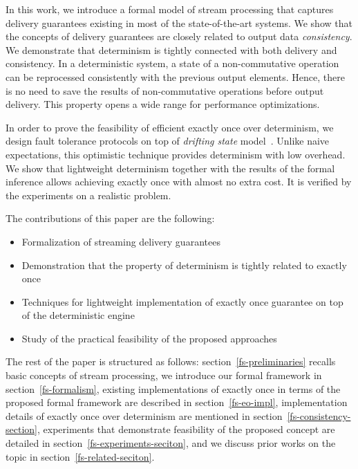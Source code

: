 In this work, we introduce a formal model of stream processing that captures delivery guarantees existing in most of the state-of-the-art systems. We show that the concepts of delivery guarantees are closely related to output data {\em consistency}. We demonstrate that determinism is tightly connected with both delivery and consistency. In a deterministic system, a state of a non-commutative operation can be reprocessed consistently with the previous output elements. Hence, there is no need to save the results of non-commutative operations before output delivery. This property opens a wide range for performance optimizations.

In order to prove the feasibility of efficient exactly once over determinism, we design fault tolerance protocols on top of {\em drifting state} model~\cite{we2018adbis}. Unlike naive expectations, this optimistic technique provides determinism with low overhead. We show that lightweight determinism together with the results of the formal inference allows achieving exactly once with almost no extra cost. It is verified by the experiments on a realistic problem.

The contributions of this paper are the following: 
\begin{itemize}
    \item Formalization of streaming delivery guarantees 
    \item Demonstration that the property of determinism is tightly related to exactly once
    \item Techniques for lightweight implementation of exactly once guarantee on top of the deterministic engine
    \item Study of the practical feasibility of the proposed approaches
\end{itemize}

The rest of the paper is structured as follows: section~\ref{fs-preliminaries} recalls basic concepts of stream processing, we introduce our formal framework in section~\ref{fs-formalism}, existing implementations of exactly once in terms of the proposed formal framework are described in section~\ref{fs-eo-impl}, implementation details of exactly once over determinism are mentioned in section~\ref{fs-consistency-section}, experiments that demonstrate feasibility of the proposed concept are detailed in section~\ref{fs-experiments-seciton}, and we discuss prior works on the topic in section~\ref{fs-related-seciton}. 
